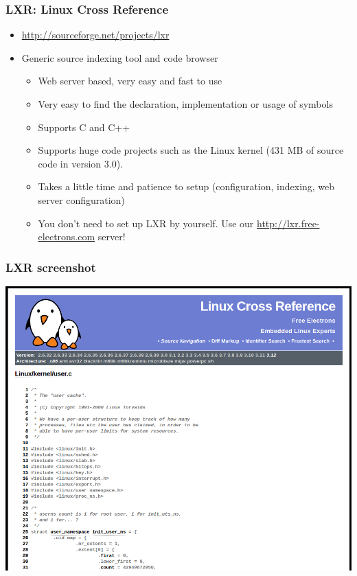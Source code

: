 \begin{frame}
  \frametitle{LXR: Linux Cross Reference}
  \begin{itemize}
  \item \url{http://sourceforge.net/projects/lxr}
  \item Generic source indexing tool and code browser
    \begin{itemize}
    \item Web server based, very easy and fast to use
    \item Very easy to find the declaration, implementation or usage
      of symbols
    \item Supports C and C++
    \item Supports huge code projects such as the Linux kernel (431 MB
      of source code in version 3.0).
    \item Takes a little time and patience to setup (configuration,
      indexing, web server configuration)
    \item You don't need to set up LXR by yourself. Use our
      \url{http://lxr.free-electrons.com} server!
    \end{itemize}
  \end{itemize}
\end{frame}

\begin{frame}
  \frametitle{LXR screenshot}
  \begin{center}
    \includegraphics[height=0.8\textheight]{slides/kernel-source-code-management/lxr.png}
  \end{center}
\end{frame}

